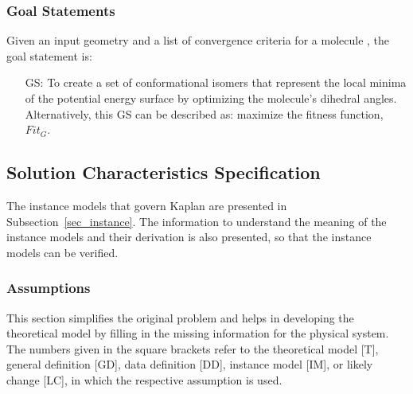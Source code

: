 \documentclass[12pt]{article}
\newcounter{goalnum} %
\newcommand{\progname}{Kaplan} %
\begin{document}


\subsubsection{Goal Statements}

\noindent Given an input geometry and a list of convergence criteria for a 
molecule , the goal statement is:

\begin{itemize}

\item[GS\refstepcounter{goalnum}\thegoalnum \label{goal}:] To 
create a set of conformational isomers that represent the local minima of the 
potential energy surface by optimizing the molecule's 
dihedral angles. 
Alternatively, this GS can be described as: maximize the fitness function, 
$Fit_G$.


\end{itemize}

\subsection{Solution Characteristics Specification}

The instance models that govern \progname{} are presented in
Subsection~\ref{sec_instance}.  The information to understand the meaning of the
instance models and their derivation is also presented, so that the instance
models can be verified.

\subsubsection{Assumptions}

This section simplifies the original problem and helps in developing the
theoretical model by filling in the missing information for the physical
system. The numbers given in the square brackets refer to the theoretical model
[T], general definition [GD], data definition [DD], instance model [IM], or
likely change [LC], in which the respective assumption is used.
\end{document}
